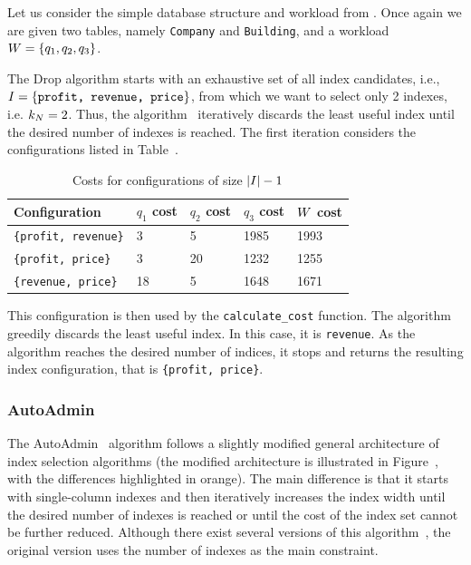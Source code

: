 \begin{example}
Let us consider the simple database structure and workload from . Once again we are given two tables, namely \texttt{Company} and \texttt{Building}, and a workload $W = \{q_1, q_2, q_3\}$.

The Drop algorithm starts with an exhaustive set of all index candidates, i.e., $I = \{\texttt{profit, revenue, price}\}$, from which we want to select only 2 indexes, i.e. $k_N = 2$. Thus, the algorithm~ iteratively discards the least useful index until the desired number of indexes is reached. The first iteration considers the configurations listed in Table~.

\begin{table}[!ht]
    \centering
    \caption{Costs for configurations of size $\vert I \vert - 1$}
    \def\arraystretch{1.25}
    \begin{tabular}{lllll}
        \toprule
        \textbf{Configuration} & \textbf{$q_1$ cost} & \textbf{$q_2$ cost} & \textbf{$q_3$ cost} & \textbf{$W$ cost}  \\
        \midrule
        \texttt{\{\texttt{profit, revenue}\}} & 3 & 5 & 1985& 1993\\
        \texttt{\{\texttt{profit, price}\}} & 3 & 20 & 1232& 1255 \\
        \texttt{\{\texttt{revenue, price}\}} & 18 & 5 & 1648& 1671 \\
        \bottomrule
    \end{tabular}
\end{table}

This configuration is then used by the \texttt{calculate\_cost} function. The algorithm greedily discards the least useful index. In this case, it is \texttt{revenue}. As the algorithm reaches the desired number of indices, it stops and returns the resulting index configuration, that is \texttt{\{\texttt{profit, price}\}}.
\end{example}

\subsubsection{AutoAdmin}
The AutoAdmin~\citep{AutoAdmin} algorithm follows a slightly modified general architecture of index selection algorithms (the modified architecture is illustrated in Figure~, with the differences highlighted in orange). The main difference is that it starts with single-column indexes and then iteratively increases the index width until the desired number of indexes is reached or until the cost of the index set cannot be further reduced. Although there exist several versions of this algorithm~\citep{NewAutoAdmin, Anytime20}, the original version uses the number of indexes as the main constraint.

